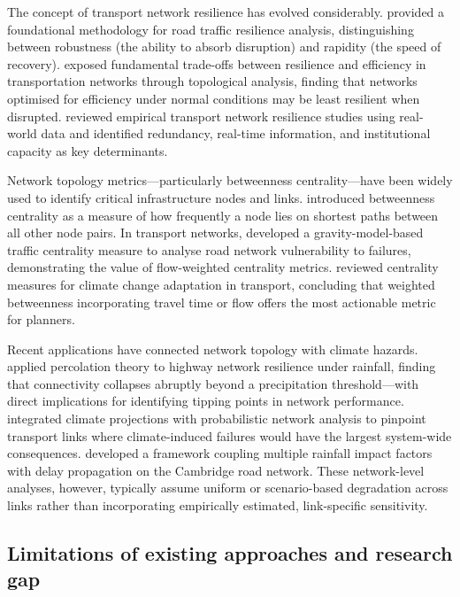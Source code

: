 \documentclass[review]{elsarticle}
\begin{document}
The concept of transport network resilience has evolved considerably. \citet{calvert2018methodology} provided a foundational methodology for road traffic resilience analysis, distinguishing between robustness (the ability to absorb disruption) and rapidity (the speed of recovery). \citet{ganin2017resilience} exposed fundamental trade-offs between resilience and efficiency in transportation networks through topological analysis, finding that networks optimised for efficiency under normal conditions may be least resilient when disrupted. \citet{bergantino2024assessing} reviewed empirical transport network resilience studies using real-world data and identified redundancy, real-time information, and institutional capacity as key determinants.

Network topology metrics---particularly betweenness centrality---have been widely used to identify critical infrastructure nodes and links. \citet{freeman1977centrality} introduced betweenness centrality as a measure of how frequently a node lies on shortest paths between all other node pairs. In transport networks, \citet{wassmer2024resilience} developed a gravity-model-based traffic centrality measure to analyse road network vulnerability to failures, demonstrating the value of flow-weighted centrality metrics. \citet{stamos2023centrality} reviewed centrality measures for climate change adaptation in transport, concluding that weighted betweenness incorporating travel time or flow offers the most actionable metric for planners.

Recent applications have connected network topology with climate hazards. \citet{li2024percolation} applied percolation theory to highway network resilience under rainfall, finding that connectivity collapses abruptly beyond a precipitation threshold---with direct implications for identifying tipping points in network performance. \citet{farahmand2024integrating} integrated climate projections with probabilistic network analysis to pinpoint transport links where climate-induced failures would have the largest system-wide consequences. \citet{liu2026extreme} developed a framework coupling multiple rainfall impact factors with delay propagation on the Cambridge road network. These network-level analyses, however, typically assume uniform or scenario-based degradation across links rather than incorporating empirically estimated, link-specific sensitivity.

\subsection{Limitations of existing approaches and research gap}
\label{sec:lit:gap}
\end{document}
